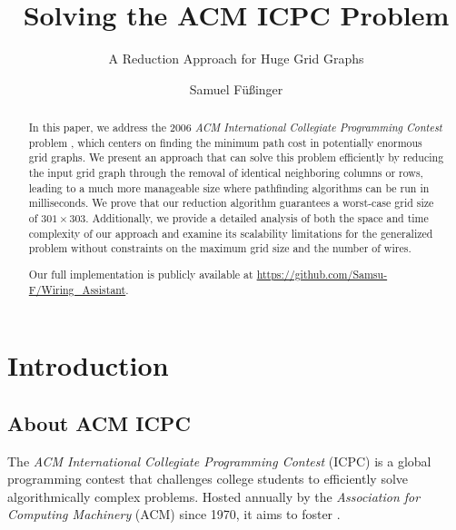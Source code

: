 \documentclass[sigconf,nonacm,screen]{acmart}
\begin{document}
\title{Solving the ACM ICPC Problem }
\subtitle{%
A Reduction Approach for Huge Grid Graphs}

\author{Samuel Füßinger}

\begin{abstract}
In this paper, we address the 2006 \emph{ACM International Collegiate Programming Contest} problem , which centers on finding the minimum path cost in potentially enormous grid graphs. We present an approach that can solve this problem efficiently by reducing the input grid graph through the removal of identical neighboring columns or rows, leading to a much more manageable size where pathfinding algorithms can be run in milliseconds. We prove that our reduction algorithm guarantees a worst-case grid size of $301\times303$. Additionally, we provide a detailed analysis of both the space and time complexity of our approach and examine its scalability limitations for the generalized problem without constraints on the maximum grid size and the number of wires.

Our full implementation is publicly available at \url{https://github.com/Samsu-F/Wiring_Assistant}.
\end{abstract}


\maketitle

\section{Introduction}
\subsection{About ACM ICPC}
The \emph{ACM International Collegiate Programming Contest} (ICPC) is a global programming contest that challenges college students to efficiently solve algorithmically complex problems. Hosted annually by the \emph{Association for Computing Machinery} (ACM) since 1970, it aims to foster  \cite{acm_icpc}.
\end{document}
